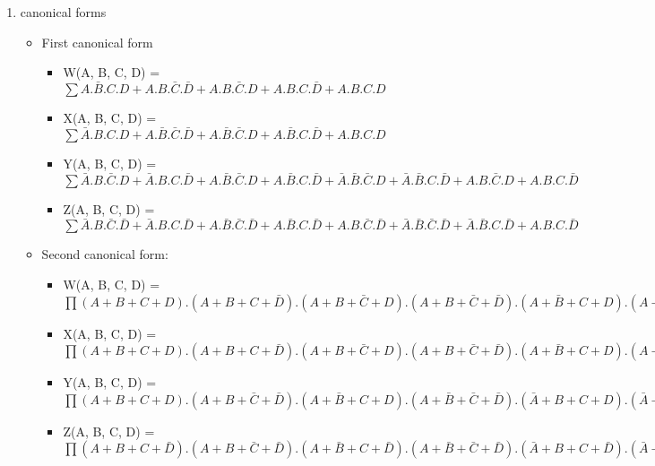 \begin{enumerate}
\begin{tabular}{|c|c|c|c|c||c|c|c|c|}
        \end{tabular}


        
\item canonical forms 
\begin{itemize}
\item First canonical form 
\begin{itemize}
\item W(A, B, C, D) = $\sum A.\bar B.C.D + A.B.\bar C.\bar D + A.B.\bar C.D + A.B.C.\bar D + A.B.C.D$
\item X(A, B, C, D) = $\sum \bar A.B.C.D + A.\bar B.\bar C.\bar D + A.\bar B.\bar C.D + A.\bar B.C.\bar D + A.B.C.D$
\item Y(A, B, C, D) = $\sum \bar A.B.\bar C.D + \bar A.B.C.\bar D + A.\bar B.\bar C.D + A.\bar B.C.\bar D + \bar A.\bar B.\bar C.D + \bar A.\bar B.C.\bar D + A.B.\bar C.D + A.B.C.\bar D$
\item Z(A, B, C, D) = $\sum \bar A.B.\bar C.\bar D + \bar A.B.C.\bar D + A.\bar B.\bar C.\bar D + A.\bar B.C.\bar D + A.B.\bar C.\bar D + \bar A.\bar B.\bar C.\bar D + \bar A.\bar B.C.\bar D + A.B.C.\bar D$
\end{itemize}
\item Second canonical form: 
\begin{itemize}
\item W(A, B, C, D) = $\prod (A+B+C+D) . (A+B+C+\bar D) . (A+B+\bar C+D) . (A+B+\bar C+\bar D) . (A+\bar B+C+D) . (A+\bar B+C+\bar D) . (A+\bar B+\bar C+D) . (A+\bar B+\bar C+\bar D) . (\bar A+B+C+D) . (\bar A+B+C+\bar D) . (\bar A+B+\bar C+D)$
\item X(A, B, C, D) = $\prod (A+B+C+D) . (A+B+C+\bar D) . (A+B+\bar C+D) . (A+B+\bar C+\bar D) . (A+\bar B+C+D) . (A+\bar B+C+\bar D) . (A+\bar B+\bar C+D) . (\bar A+B+\bar C+\bar D) . (\bar A+\bar B+C+D) . (\bar A+\bar B+C+\bar D) . (\bar A+\bar B+\bar C+D)$
\item Y(A, B, C, D) = $\prod (A+B+C+D) . (A+B+\bar C+\bar D) . (A+\bar B+C+D) . (A+\bar B+\bar C+\bar D) . (\bar A+B+C+D) . (\bar A+B+\bar C+\bar D) . (\bar A+\bar B+C+D) . (\bar A+\bar B+\bar C+\bar D)$
\item Z(A, B, C, D) = $\prod (A+B+C+\bar D) . (A+B+\bar C+\bar D) . (A+\bar B+C+\bar D) . (A+\bar B+\bar C+\bar D) . (\bar A+B+C+\bar D) . (\bar A+B+\bar C+\bar D) . (\bar A+\bar B+C+\bar D) . (\bar A+\bar B+\bar C+\bar D)$
\end{itemize}

\end{itemize}
\end{enumerate}
